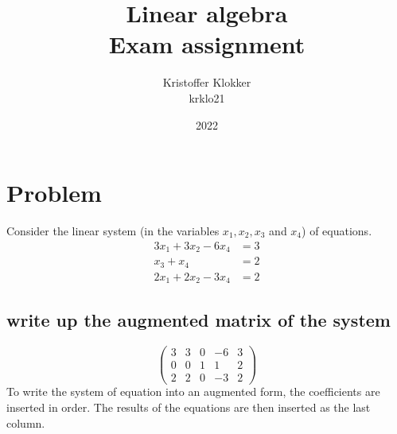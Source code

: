 \documentclass[12pt, a4paper]{article}
\title{Linear algebra\\Exam assignment}
\date{2022}
\author{Kristoffer Klokker\\krklo21}
\begin{document}
	\maketitle
	\clearpage
	\tableofcontents
	\clearpage
	\section{Problem}
		Consider the linear system (in the variables $x_1,x_2,x_3$ and $x_4$) of equations.
		\begin{align*}3x_1+3x_2-6x_4&=3\\
		x_3+x_4&=2\\
		2x_1+2x_2-3x_4&=2\end{align*}
		\subsection{write up the augmented matrix of the system}
			$$\left(
			    \begin{array}{cccc|c}
			    3&3&0&-6&3\\ 
			    0&0&1&1&2\\
			    2&2&0&-3&2
			    \end{array}
			\right)$$
			To write the system of equation into an augmented form, the coefficients are inserted in order. The results of the equations are then inserted as the last column.
\end{document}
